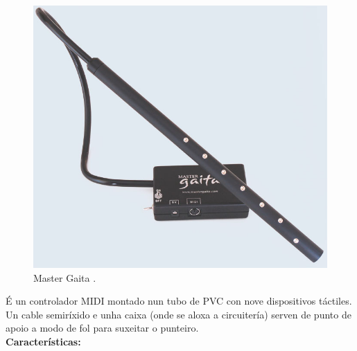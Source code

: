   \begin{figure}[htbp]
   \centering
   \includegraphics[scale=0.2,keepaspectratio=true]{./imagenes/master-gaita.jpg}
   \caption[Master Gaita]{Master Gaita \cite{MasterGaita}.}
   \label{figura:MasterGaita}
  \end{figure}

  É un controlador MIDI montado nun tubo de PVC con nove dispositivos táctiles.
  Un cable semiríxido e unha caixa (onde se aloxa a circuitería) serven de
  punto de apoio a modo de fol para suxeitar o punteiro. \\

  \textbf{Características:}


